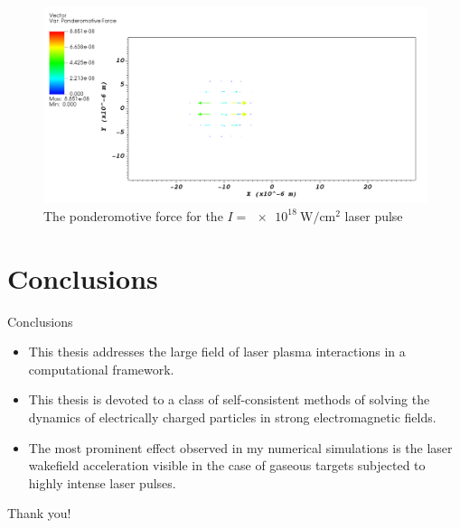 \documentclass{beamer}
\begin{document}
\begin{frame}
	\begin{figure}[h]
	  \centering
	  \includegraphics[width=\textwidth,height=0.5\textheight]{lwfa-i18-pond-f}
	  \caption{The ponderomotive force for the \(I=\SI{e18}{\watt\per\centi\metre\squared}\)
	  laser pulse}%
	\end{figure}
\end{frame}


\section{Conclusions}

\begin{frame}{Conclusions}
	\begin{itemize}
		\item This thesis addresses the large field of laser plasma interactions in a
		computational framework.
		\item This thesis is devoted to a class of self-consistent methods of
		solving the dynamics of electrically charged particles in strong electromagnetic
		fields.
		\item The most prominent effect observed in my numerical simulations is the
		laser wakefield acceleration visible in the case of gaseous targets subjected
		to highly intense laser pulses.
	\end{itemize}
\end{frame}


\begin{frame}[standout]
Thank you!
\end{frame}
\end{document}
